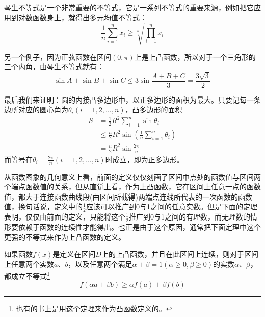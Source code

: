 琴生不等式是一个非常重要的不等式，它是一系列不等式的重要来源，例如把它应用到对数函数身上，就得出多元均值不等式：
\begin{equation*}
\frac{1}{n}\sum_{i=1}^nx_i \geqslant \sqrt[n]{\prod_{i=1}^nx_i}
\end{equation*}

另一个例子，因为正弦函数在区间$(0,\pi)$上是上凸函数，所以对于一个三角形的三个内角，由琴生不等式就有：
\begin{equation*}
\sin{A}+\sin{B}+\sin{C} \leqslant 3\sin{\frac{A+B+C}{3}} = \frac{3\sqrt{3}}{2}
\end{equation*}

最后我们来证明：圆的内接凸多边形中，以正多边形的面积为最大。只要记每一条边所对应的圆心角为$\theta_i(i=1,2,\ldots,n)$，凸多边形的面积
\begin{align*}
  S &= \frac{1}{2}R^2 \sum_{i=1}^n \sin{\theta_i} \\
& \leqslant \frac{n}{2}R^2 \sin{\left(\frac{1}{n}\sum_{i=1}^n\theta_i\right)} \\
    & =  \frac{n}{2}R^2 \sin{\frac{2\pi}{n}}
\end{align*}
而等号在$\theta_i=\frac{2\pi}{n}(i=1,2,\ldots,n)$时成立，即为正多边形。

从函数图象的几何意义上看，前面的定义仅仅刻画了区间中点处的函数值与区间两个端点函数值的关系，但从直觉上看，作为上凸函数，它在区间上任意一点的函数值，都大于连接函数曲线段(由区间所截得)两端点连线所代表的一次函数的函数值，换句话说，定义中的$\frac{1}{2}$应该可以推广到0与1之间的任意实数。但是下面的定理表明，仅仅由前面的定义，只能将这个$\frac{1}{2}$推广到0与1之间的有理数，而无理数的情形要依赖于函数的连续性才能得出。也正是由于这个原因，通常把下面定理中这个更强的不等式来作为上凸函数的定义。

\begin{theorem}
  \label{theorem:convexity-function-with-weight}
  如果函数$f(x)$是定义在区间$D$上的上凸函数，并且在此区间上连续，则对于区间上任意两个实数$a$、$b$，以及任意两个满足$\alpha + \beta = 1(\alpha \geqslant 0, \beta \geqslant 0)$的实数$\alpha$、$\beta$，都成立不等式\footnote{也有的书上是用这个定理来作为凸函数定义的。}
  \begin{equation}
    \label{eq:convexity-function-with-weight}
    f(\alpha a + \beta b) \geqslant \alpha f(a) + \beta f(b) 
  \end{equation}
\end{theorem}

